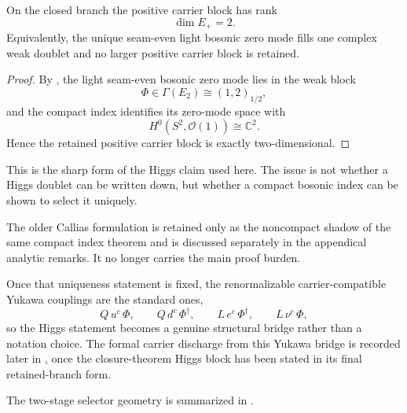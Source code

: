\begin{corollary}
\label{cor:bosonic-rank-two}
On the closed branch the positive carrier block has rank
\[
\dim E_+=2.
\]
Equivalently, the unique seam-even light bosonic zero mode fills one complex weak doublet and no
larger positive carrier block is retained.
\end{corollary}

\begin{proof}
By , the light seam-even bosonic zero mode lies in the weak block
\[
\Phi\in\Gamma(E_2)\cong (1,2)_{1/2},
\]
and the compact index identifies its zero-mode space with
\[
H^0(S^2,\mathcal O(1))\cong\mathbb C^2.
\]
Hence the retained positive carrier block is exactly two-dimensional.
\end{proof}

This is the sharp form of the Higgs claim used here. The issue is not whether a Higgs doublet can
be written down, but whether a compact bosonic index can be shown to select it uniquely.
\begin{remark}
The older Callias formulation is retained only as the noncompact shadow of the same compact index
theorem and is discussed separately in the appendical analytic remarks. It no longer carries the
main proof burden.
\end{remark}

Once that uniqueness statement is fixed, the renormalizable carrier-compatible Yukawa couplings
are the standard ones,
\[
Q\,u^c\,\Phi,
\qquad
Q\,d^c\,\Phi^\dagger,
\qquad
L\,e^c\,\Phi^\dagger,
\qquad
L\,\nu^c\,\Phi,
\]
so the Higgs statement becomes a genuine structural bridge rather than a notation choice. The
formal carrier discharge from this Yukawa bridge is recorded later in
, once the closure-theorem Higgs block has
been stated in its final retained-branch form.



The two-stage selector geometry is summarized in .

